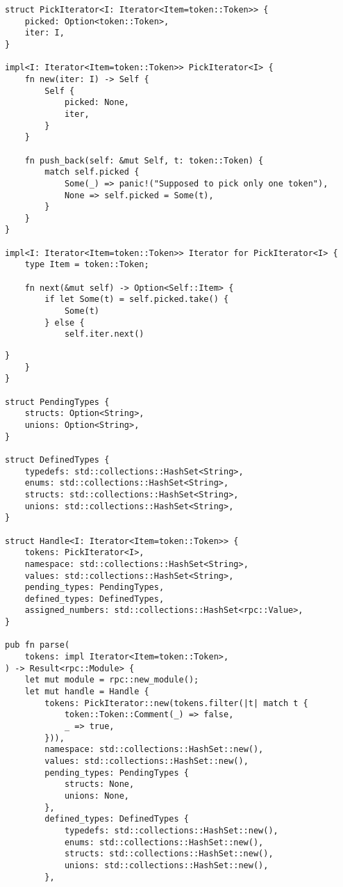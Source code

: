 \begin{lstlisting}[caption={Разбор определения (часть 1)}, label={lst:rust_parser_main1}]
struct PickIterator<I: Iterator<Item=token::Token>> {
    picked: Option<token::Token>,
    iter: I,
}

impl<I: Iterator<Item=token::Token>> PickIterator<I> {
    fn new(iter: I) -> Self {
        Self {
            picked: None,
            iter,
        }
    }

    fn push_back(self: &mut Self, t: token::Token) {
        match self.picked {
            Some(_) => panic!("Supposed to pick only one token"),
            None => self.picked = Some(t),
        }
    }
}

impl<I: Iterator<Item=token::Token>> Iterator for PickIterator<I> {
    type Item = token::Token;

    fn next(&mut self) -> Option<Self::Item> {
        if let Some(t) = self.picked.take() {
            Some(t)
        } else {
            self.iter.next()
\end{lstlisting}
\clearpage
\begin{lstlisting}[caption={Разбор определения (часть 2)}, label={lst:rust_parser_main2}]
        }
    }
}

struct PendingTypes {
    structs: Option<String>,
    unions: Option<String>,
}

struct DefinedTypes {
    typedefs: std::collections::HashSet<String>,
    enums: std::collections::HashSet<String>,
    structs: std::collections::HashSet<String>,
    unions: std::collections::HashSet<String>,
}

struct Handle<I: Iterator<Item=token::Token>> {
    tokens: PickIterator<I>,
    namespace: std::collections::HashSet<String>,
    values: std::collections::HashSet<String>,
    pending_types: PendingTypes,
    defined_types: DefinedTypes,
    assigned_numbers: std::collections::HashSet<rpc::Value>,
}

pub fn parse(
    tokens: impl Iterator<Item=token::Token>,
) -> Result<rpc::Module> {
    let mut module = rpc::new_module();
    let mut handle = Handle {
        tokens: PickIterator::new(tokens.filter(|t| match t {
            token::Token::Comment(_) => false,
            _ => true,
        })),
        namespace: std::collections::HashSet::new(),
        values: std::collections::HashSet::new(),
        pending_types: PendingTypes {
            structs: None,
            unions: None,
        },
        defined_types: DefinedTypes {
            typedefs: std::collections::HashSet::new(),
            enums: std::collections::HashSet::new(),
            structs: std::collections::HashSet::new(),
            unions: std::collections::HashSet::new(),
        },
\end{lstlisting}
